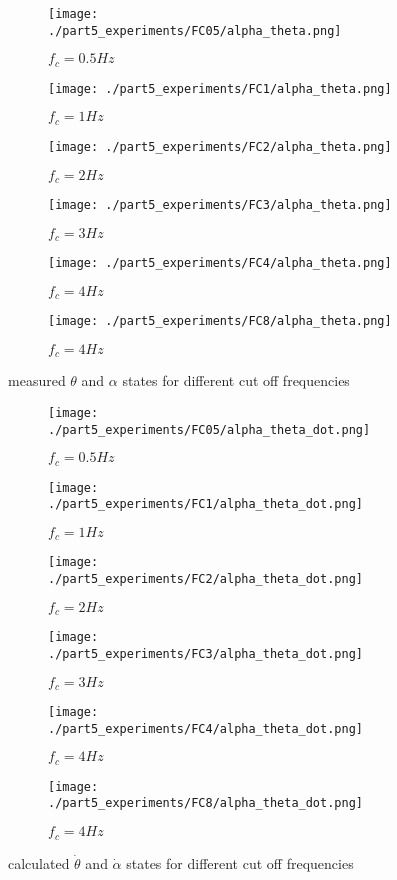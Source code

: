\begin{figure}[H]
	\centering
	\begin{subfigure}[b]{0.4\textwidth}
		\texttt{[image: ./part5\_experiments/FC05/alpha\_theta.png]}
		\caption{$f_c=0.5Hz$}
	\end{subfigure}
	\begin{subfigure}[b]{0.4\textwidth}
		\texttt{[image: ./part5\_experiments/FC1/alpha\_theta.png]}
		\caption{$f_c=1Hz$}
	\end{subfigure}
	\begin{subfigure}[b]{0.4\textwidth}
		\texttt{[image: ./part5\_experiments/FC2/alpha\_theta.png]}
		\caption{$f_c=2Hz$}
	\end{subfigure}
	\begin{subfigure}[b]{0.4\textwidth}
		\texttt{[image: ./part5\_experiments/FC3/alpha\_theta.png]}
		\caption{$f_c=3Hz$}
	\end{subfigure}
	\begin{subfigure}[b]{0.4\textwidth}
		\texttt{[image: ./part5\_experiments/FC4/alpha\_theta.png]}
		\caption{$f_c=4Hz$}
	\end{subfigure}
	\begin{subfigure}[b]{0.4\textwidth}
		\texttt{[image: ./part5\_experiments/FC8/alpha\_theta.png]}
		\caption{$f_c=4Hz$}
	\end{subfigure}
	\caption{measured $\theta$ and $\alpha$ states for different cut off frequencies}
	\label{m_s_f}
\end{figure}
\begin{figure}[H]
	\centering
	\begin{subfigure}[b]{0.4\textwidth}
		\texttt{[image: ./part5\_experiments/FC05/alpha\_theta\_dot.png]}
		\caption{$f_c=0.5Hz$}
	\end{subfigure}
	\begin{subfigure}[b]{0.4\textwidth}
		\texttt{[image: ./part5\_experiments/FC1/alpha\_theta\_dot.png]}
		\caption{$f_c=1Hz$}
	\end{subfigure}
	\begin{subfigure}[b]{0.4\textwidth}
		\texttt{[image: ./part5\_experiments/FC2/alpha\_theta\_dot.png]}
		\caption{$f_c=2Hz$}
	\end{subfigure}
	\begin{subfigure}[b]{0.4\textwidth}
		\texttt{[image: ./part5\_experiments/FC3/alpha\_theta\_dot.png]}
		\caption{$f_c=3Hz$}
	\end{subfigure}
	\begin{subfigure}[b]{0.4\textwidth}
		\texttt{[image: ./part5\_experiments/FC4/alpha\_theta\_dot.png]}
		\caption{$f_c=4Hz$}
	\end{subfigure}
	\begin{subfigure}[b]{0.4\textwidth}
		\texttt{[image: ./part5\_experiments/FC8/alpha\_theta\_dot.png]}
		\caption{$f_c=4Hz$}
	\end{subfigure}
	\caption{calculated $\dot{\theta}$ and $\dot{\alpha}$ states for different cut off frequencies}
	\label{e_s_f}
\end{figure}

